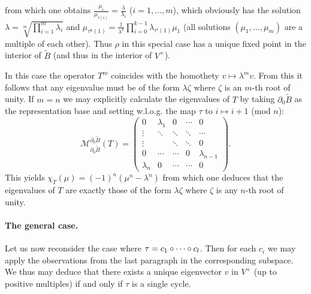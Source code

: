 \documentclass{article}
\begin{document}
from which one obtains $\frac{\mu_i}{\mu_{\tau(i)}}=\frac{\lambda}{\lambda_i}$ ($i=1,\ldots,m$), which obviously has the solution $\lambda = \sqrt[m]{\prod_{i=1}^m{\lambda_i}}$ 
and $\mu_{\tau^k(1)}=\frac{1}{\lambda^k}\prod_{i=0}^{k-1}{\lambda_{\tau^i(1)}}\mu_1$ (all solutions $(\mu_1,\ldots,\mu_m)$ are a multiple of each other). 
Thus $\rho$ in this special case has a unique fixed point in the interior of $\tilde{B}$ (and thus in the interior of $V^+$).

\begin{remark}\label{rem7}
In this case the operator $T^m$ coincides with the homothety $v\mapsto \lambda^m v$. From this it follows that any eigenvalue must be of the form $\lambda\zeta$ where $\zeta$ is an $m$-th root of unity.
If $m=n$ we may explicitly calculate the eigenvalues of $T$ by taking $\partial_0{\tilde{B}}$ as the representation base and setting w.l.o.g. the map $\tau$ to $i\mapsto i+1$ (mod $n$):
\begin{equation}
\mathcal{M}_{\partial_0{\tilde{B}}}^{\partial_0{\tilde{B}}}(T)=\begin{pmatrix}
0 & \lambda_1 & 0 & \cdots & 0\\
\vdots & \ddots & \ddots & \ddots & \cdots\\
\vdots &  & \ddots & \ddots & 0\\
0 & \cdots & \cdots & 0 & \lambda_{n-1}\\
\lambda_n & 0 & \cdots & \cdots & 0
\end{pmatrix}\text{.}
\end{equation}
This yields $\chi_T(\mu)=(-1)^n(\mu^n-\lambda^n)$ from which one deduces that the eigenvalues of $T$ are exactly those of the form $\lambda\zeta$ where $\zeta$ is any $n$-th root of unity.
\end{remark}

\paragraph{The general case.}

Let us now reconsider the case where $\tau=c_1\circ\cdots\circ c_l$. Then for each $c_i$ we may apply the observations from the last paragraph in the corresponding subspace. We thus may deduce that there exists a unique eigenvector $v$ in $V^+$ (up to positive multiples) if and only if $\tau$ is a single cycle.
\end{document}
